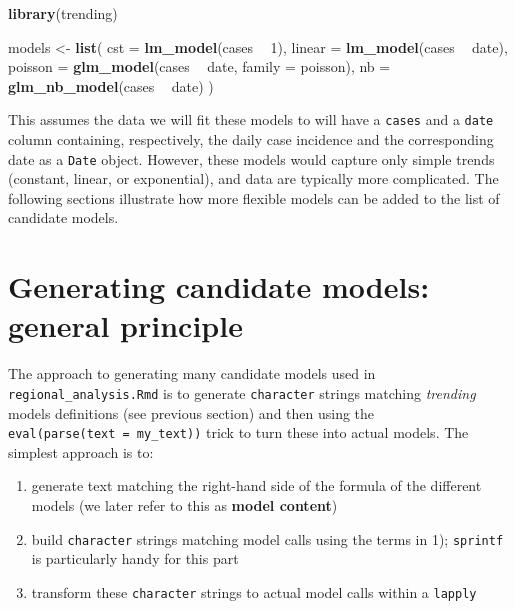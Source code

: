 \documentclass[]{book}
\newenvironment{Shaded}{\begin{snugshade}}{\end{snugshade}}
\newcommand{\DataTypeTok}[1]{\textcolor[rgb]{0.13,0.29,0.53}{#1}}
\newcommand{\DecValTok}[1]{\textcolor[rgb]{0.00,0.00,0.81}{#1}}
\newcommand{\KeywordTok}[1]{\textcolor[rgb]{0.13,0.29,0.53}{\textbf{#1}}}
\newcommand{\NormalTok}[1]{#1}
\newcommand{\OperatorTok}[1]{\textcolor[rgb]{0.81,0.36,0.00}{\textbf{#1}}}
\newcommand{\StringTok}[1]{\textcolor[rgb]{0.31,0.60,0.02}{#1}}
\begin{document}
\begin{Shaded}
\begin{Highlighting}[]

\KeywordTok{library}\NormalTok{(trending)}

\NormalTok{models <-}\StringTok{ }\KeywordTok{list}\NormalTok{(}
  \DataTypeTok{cst =} \KeywordTok{lm_model}\NormalTok{(cases }\OperatorTok{~}\StringTok{ }\DecValTok{1}\NormalTok{),}
  \DataTypeTok{linear =} \KeywordTok{lm_model}\NormalTok{(cases }\OperatorTok{~}\StringTok{ }\NormalTok{date),}
  \DataTypeTok{poisson =} \KeywordTok{glm_model}\NormalTok{(cases }\OperatorTok{~}\StringTok{ }\NormalTok{date, }\DataTypeTok{family =}\NormalTok{ poisson),}
  \DataTypeTok{nb =} \KeywordTok{glm_nb_model}\NormalTok{(cases }\OperatorTok{~}\StringTok{ }\NormalTok{date)}
\NormalTok{)}
\end{Highlighting}
\end{Shaded}

This assumes the data we will fit these models to will have a \texttt{cases} and a
\texttt{date} column containing, respectively, the daily case incidence and the
corresponding date as a \texttt{Date} object. However, these models would capture only
simple trends (constant, linear, or exponential), and data are typically more
complicated. The following sections illustrate how more flexible models can be
added to the list of candidate models.

\hypertarget{generating-candidate-models-general-principle}{%
\section{Generating candidate models: general principle}\label{generating-candidate-models-general-principle}}

The approach to generating many candidate models used in \texttt{regional\_analysis.Rmd}
is to generate \texttt{character} strings matching \emph{trending} models definitions (see
previous section) and then using the \texttt{eval(parse(text\ =\ my\_text))} trick to turn
these into actual models. The simplest approach is to:

\begin{enumerate}
\def\labelenumi{\arabic{enumi}.}
\item
  generate text matching the right-hand side of the formula of the different
  models (we later refer to this as \textbf{model content})
\item
  build \texttt{character} strings matching model calls using the terms in 1); \texttt{sprintf}
  is particularly handy for this part
\item
  transform these \texttt{character} strings to actual model calls within a \texttt{lapply}
\end{enumerate}
\end{document}

